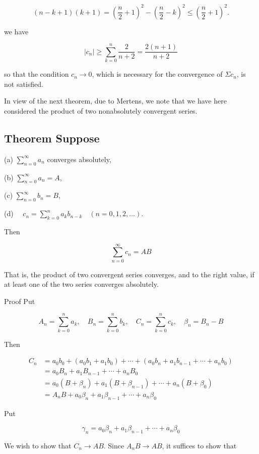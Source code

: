 \documentclass[10pt]{article}
\begin{document}
$$
(n-k+1)(k+1)=\left(\frac{n}{2}+1\right)^{2}-\left(\frac{n}{2}-k\right)^{2} \leq\left(\frac{n}{2}+1\right)^{2} .
$$

we have

$$
\left|c_{n}\right| \geq \sum_{k=0}^{n} \frac{2}{n+2}=\frac{2(n+1)}{n+2}
$$

so that the condition $c_{n} \rightarrow 0$, which is necessary for the convergence of $\Sigma c_{n}$, is not satisfied.

In view of the next theorem, due to Mertens, we note that we have here considered the product of two nonabsolutely convergent series.

\subsection{Theorem Suppose}
(a) $\sum_{n=0}^{\infty} a_{n}$ converges absolutely,

(b) $\sum_{n=0}^{\infty} a_{n}=A$,

(c) $\sum_{n=0}^{\infty} b_{n}=B$,

(d) $\quad c_{n}=\sum_{k=0}^{n} a_{k} b_{n-k} \quad(n=0,1,2, \ldots)$.

Then

$$
\sum_{n=0}^{\infty} c_{n}=A B
$$

That is, the product of two convergent series converges, and to the right value, if at least one of the two series converges absolutely.

Proof Put

$$
A_{n}=\sum_{k=0}^{n} a_{k}, \quad B_{n}=\sum_{k=0}^{n} b_{k}, \quad C_{n}=\sum_{k=0}^{n} c_{k}, \quad \beta_{n}=B_{n}-B
$$

Then

$$
\begin{aligned}
C_{n} & =a_{0} b_{0}+\left(a_{0} b_{1}+a_{1} b_{0}\right)+\cdots+\left(a_{0} b_{n}+a_{1} b_{n-1}+\cdots+a_{n} b_{0}\right) \\
& =a_{0} B_{n}+a_{1} B_{n-1}+\cdots+a_{n} B_{0} \\
& =a_{0}\left(B+\beta_{n}\right)+a_{1}\left(B+\beta_{n-1}\right)+\cdots+a_{n}\left(B+\beta_{0}\right) \\
& =A_{n} B+a_{0} \beta_{n}+a_{1} \beta_{n-1}+\cdots+a_{n} \beta_{0}
\end{aligned}
$$

Put

$$
\gamma_{n}=a_{0} \beta_{n}+a_{1} \beta_{n-1}+\cdots+a_{n} \beta_{0}
$$

We wish to show that $C_{n} \rightarrow A B$. Since $A_{n} B \rightarrow A B$, it suffices to show that
\end{document}
